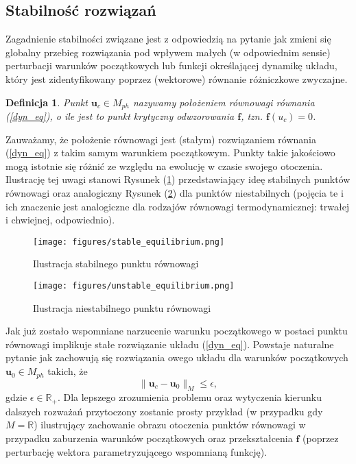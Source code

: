 \documentclass[12pt]{article}
\newtheorem{defi}{Definicja}
\begin{document}
\subsection{Stabilność rozwiązań}
Zagadnienie stabilności związane jest z odpowiedzią na pytanie jak zmieni się globalny przebieg rozwiązania pod wpływem małych (w odpowiednim sensie) perturbacji warunków początkowych lub funkcji określającej dynamikę układu, który jest zidentyfikowany poprzez (wektorowe) równanie różniczkowe zwyczajne.
\begin{defi}\label{crit_points}
	Punkt $ \textbf{u}_{c} \in M_{ph}$ nazywamy położeniem równowagi równania (\ref{dyn_eq}), o ile jest to punkt krytyczny odwzorowania $ \textbf{f} $, tzn. $ \textbf{f}(u_{c}) = 0 $.
\end{defi}
Zauważamy, że położenie równowagi jest (stałym) rozwiązaniem równania (\ref{dyn_eq}) z takim samym warunkiem początkowym. Punkty takie jakościowo mogą istotnie się różnić ze względu na ewolucję w czasie swojego otoczenia. Ilustrację tej uwagi stanowi Rysunek (\ref{Fig2}) przedstawiający ideę stabilnych  punktów równowagi oraz analogiczny Rysunek (\ref{Fig3}) dla punktów niestabilnych (pojęcia te i ich znaczenie jest analogiczne dla rodzajów równowagi termodynamicznej: trwałej i chwiejnej, odpowiednio).
\begin{figure}[H]
	\texttt{[image: figures/stable\_equilibrium.png]}
	\centering
	\caption{Ilustracja stabilnego punktu równowagi}
	\label{Fig2}
\end{figure}
\begin{figure}[H]
	\texttt{[image: figures/unstable\_equilibrium.png]} 
	\centering
	\caption{Ilustracja niestabilnego punktu równowagi}
	\label{Fig3}
\end{figure}
Jak już zostało wspomniane narzucenie warunku początkowego w postaci punktu równowagi implikuje stałe rozwiązanie układu (\ref{dyn_eq}). Powstaje naturalne pytanie jak zachowują się rozwiązania owego układu dla warunków początkowych  $ \textbf{u}_{0} \in M_{ph}$ takich, że
\begin{equation}
	\| \textbf{u}_{c} - \textbf{u}_{0} \|_{M}  \leq \epsilon,
\label{x_xc}
\end{equation}
gdzie $ \epsilon \in \mathbb{R}_{+} $.\newline
Dla lepszego zrozumienia problemu oraz wytyczenia kierunku dalszych rozważań przytoczony zostanie prosty przykład (w przypadku gdy $ M = \mathbb{R} $) ilustrujący zachowanie obrazu otoczenia punktów równowagi w przypadku zaburzenia warunków początkowych oraz przekształcenia $ \textbf{f} $ (poprzez perturbację wektora parametryzującego wspomnianą funkcję). \newline
\end{document}
